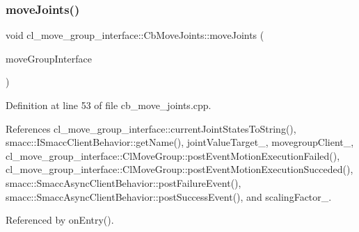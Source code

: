 \subsubsection{\texorpdfstring{move\+Joints()}{moveJoints()}}
{\footnotesize\ttfamily void cl\+\_\+move\+\_\+group\+\_\+interface\+::\+Cb\+Move\+Joints\+::move\+Joints (\begin{DoxyParamCaption}\item[{moveit\+::planning\+\_\+interface\+::\+Move\+Group\+Interface \&}]{move\+Group\+Interface }\end{DoxyParamCaption})\hspace{0.3cm}{\ttfamily [protected]}}



Definition at line 53 of file cb\+\_\+move\+\_\+joints.\+cpp.



References cl\+\_\+move\+\_\+group\+\_\+interface\+::current\+Joint\+States\+To\+String(), smacc\+::\+I\+Smacc\+Client\+Behavior\+::get\+Name(), joint\+Value\+Target\+\_\+, movegroup\+Client\+\_\+, cl\+\_\+move\+\_\+group\+\_\+interface\+::\+Cl\+Move\+Group\+::post\+Event\+Motion\+Execution\+Failed(), cl\+\_\+move\+\_\+group\+\_\+interface\+::\+Cl\+Move\+Group\+::post\+Event\+Motion\+Execution\+Succeded(), smacc\+::\+Smacc\+Async\+Client\+Behavior\+::post\+Failure\+Event(), smacc\+::\+Smacc\+Async\+Client\+Behavior\+::post\+Success\+Event(), and scaling\+Factor\+\_\+.



Referenced by on\+Entry().


